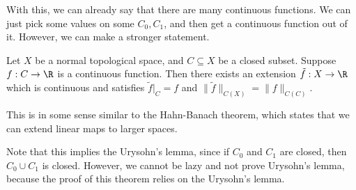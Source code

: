 \documentclass[a4paper]{article}
\begin{document}
With this, we can already say that there are many continuous functions. We can just pick some values on some $C_0, C_1$, and then get a continuous function out of it. However, we can make a stronger statement.

\begin{thm}
  Let $X$ be a normal topological space, and $C\subseteq X$ be a closed subset. Suppose $f: C \to \R$ is a continuous function. Then there exists an extension $\tilde{f}: X \to \R$ which is continuous and satisfies $\tilde{f}|_C = f$ and $\|\tilde{f}\|_{C(X)} = \|f\|_{C(C)}$.
\end{thm}
This is in some sense similar to the Hahn-Banach theorem, which states that we can extend linear maps to larger spaces.

Note that this implies the Urysohn's lemma, since if $C_0$ and $C_1$ are closed, then $C_0\cup C_1$ is closed. However, we cannot be lazy and not prove Urysohn's lemma, because the proof of this theorem relies on the Urysohn's lemma.
\end{document}
